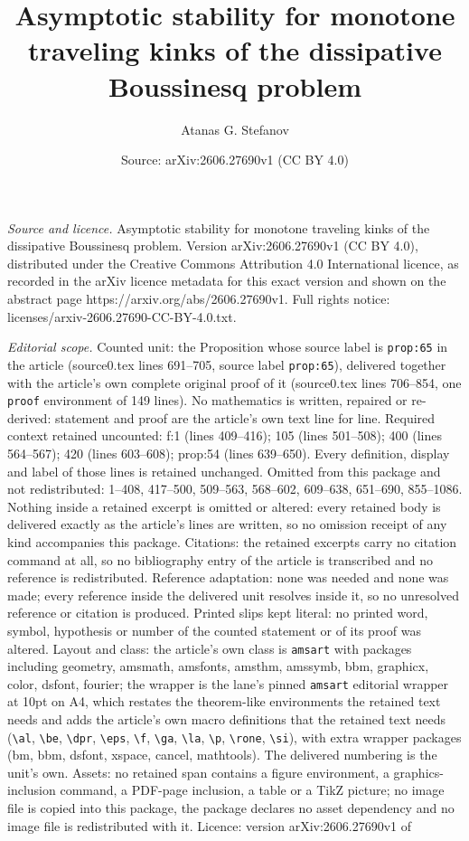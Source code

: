 \documentclass[10pt,a4paper]{amsart}
\title[Asymptotic stability for monotone traveling kinks of the dis]{Asymptotic stability for monotone traveling kinks of the dissipative Boussinesq problem}
\author{Atanas G. Stefanov}
\date{Source: arXiv:2606.27690v1 (CC BY 4.0)}
\begin{document}
\maketitle

\noindent\emph{Source and licence.} Asymptotic stability for monotone traveling kinks of the dissipative Boussinesq problem. Version arXiv:2606.27690v1 (CC BY 4.0), distributed under the Creative Commons Attribution 4.0 International licence, as recorded in the arXiv licence metadata for this exact version and shown on the abstract page https://arxiv.org/abs/2606.27690v1. Full rights notice: licenses/arxiv-2606.27690-CC-BY-4.0.txt.\par\smallskip

\noindent\textit{Editorial scope.} Counted unit: the Proposition whose source label is \texttt{prop:65} in the article (source0.tex lines 691--705, source label \texttt{prop:65}), delivered together with the article's own complete original proof of it (source0.tex lines 706--854, one \texttt{proof} environment of 149 lines). No mathematics is written, repaired or re-derived: statement and proof are the article's own text line for line. Required context retained uncounted: f:1 (lines 409--416); 105 (lines 501--508); 400 (lines 564--567); 420 (lines 603--608); prop:54 (lines 639--650). Every definition, display and label of those lines is retained unchanged. Omitted from this package and not redistributed: 1--408, 417--500, 509--563, 568--602, 609--638, 651--690, 855--1086. Nothing inside a retained excerpt is omitted or altered: every retained body is delivered exactly as the article's lines are written, so no omission receipt of any kind accompanies this package. Citations: the retained excerpts carry no citation command at all, so no bibliography entry of the article is transcribed and no reference is redistributed. Reference adaptation: none was needed and none was made; every reference inside the delivered unit resolves inside it, so no unresolved reference or citation is produced. Printed slips kept literal: no printed word, symbol, hypothesis or number of the counted statement or of its proof was altered. Layout and class: the article's own class is \texttt{amsart} with packages including geometry, amsmath, amsfonts, amsthm, amssymb, bbm, graphicx, color, dsfont, fourier; the wrapper is the lane's pinned \texttt{amsart} editorial wrapper at 10pt on A4, which restates the theorem-like environments the retained text needs and adds the article's own macro definitions that the retained text needs (\texttt{\textbackslash al}, \texttt{\textbackslash be}, \texttt{\textbackslash dpr}, \texttt{\textbackslash eps}, \texttt{\textbackslash f}, \texttt{\textbackslash ga}, \texttt{\textbackslash la}, \texttt{\textbackslash p}, \texttt{\textbackslash rone}, \texttt{\textbackslash si}), with extra wrapper packages (bm, bbm, dsfont, xspace, cancel, mathtools). The delivered numbering is the unit's own. Assets: no retained span contains a figure environment, a graphics-inclusion command, a PDF-page inclusion, a table or a TikZ picture; no image file is copied into this package, the package declares no asset dependency and no image file is redistributed with it. Licence: version arXiv:2606.27690v1 of 
\end{document}
